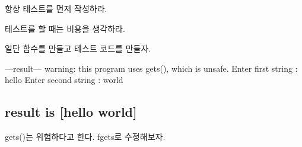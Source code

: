 
\begin{DoxyRefList}
\item[\label{todo__todo000001}%
\hypertarget{todo__todo000001}{}%
File \hyperlink{hw02_8c}{hw02.c} ]
\begin{DoxyItemize}
\item 항상 테스트를 먼저 작성하라.
\item 테스트를 할 때는 비용을 생각하라. 
\end{DoxyItemize}
\item[\label{todo__todo000003}%
\hypertarget{todo__todo000003}{}%
File \hyperlink{hw04_8c}{hw04.c} ]
\begin{DoxyItemize}
\item 일단 함수를 만들고 테스트 코드를 만들자.  
\end{DoxyItemize}
\item[\label{todo__todo000002}%
\hypertarget{todo__todo000002}{}%
Global \hyperlink{hw03_8c_a6101cfaa967e228216889bfb54104183}{mystrcat\-\_\-exec} (void)]---result--- warning\-: this program uses gets(), which is unsafe. Enter first string \-: hello Enter second string \-: world \subsection*{result is \mbox{[}hello world\mbox{]} }

gets()는 위험하다고 한다. fgets로 수정해보자. 
\end{DoxyRefList}